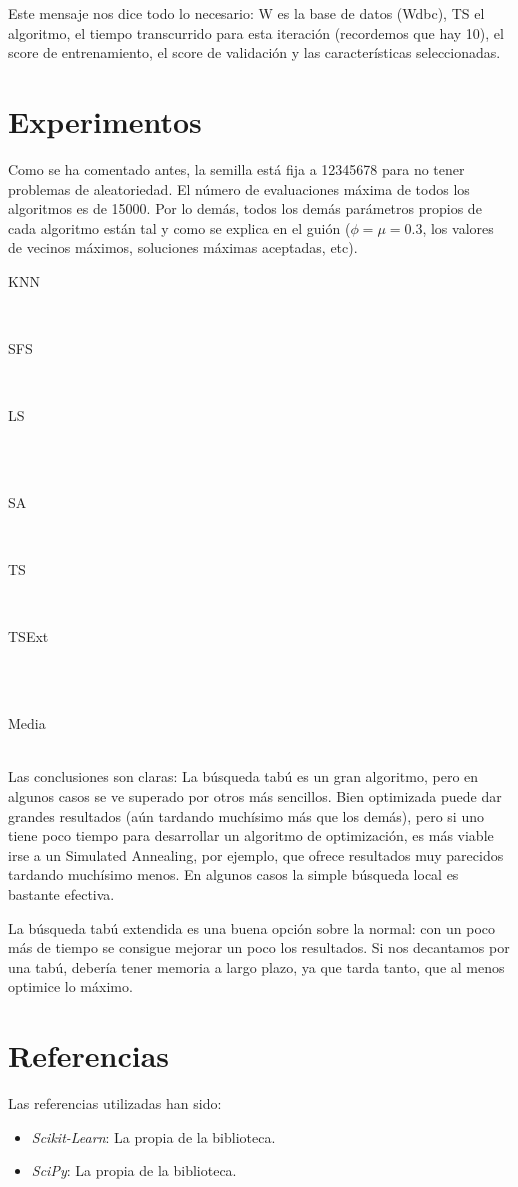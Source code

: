 \documentclass[a4paper, 11pt]{article}
\begin{document}
    Este mensaje nos dice todo lo necesario: W es la base de datos (Wdbc), TS el algoritmo, el tiempo transcurrido para esta iteración (recordemos que hay 10), el score de entrenamiento, el score de validación y las características seleccionadas.
  \section{Experimentos}
    Como se ha comentado antes, la semilla está fija a 12345678 para no tener problemas de aleatoriedad. El número de evaluaciones máxima de todos los algoritmos es de 15000. Por lo demás, todos los demás parámetros propios de cada algoritmo están tal y como se explica en el guión ($\phi=\mu=0.3$, los valores de vecinos máximos, soluciones máximas aceptadas, etc). \\

    \newpage

    \centerline{KNN}
    \\
    \centerline{SFS}
    
    \\ \centerline{LS}
    \\
    \\ \centerline{SA}
    
    \\ \centerline{TS}
     \\
    \newpage
     \centerline{TSExt}
     \\
    \\ \centerline{Media}
    \\

    Las conclusiones son claras: La búsqueda tabú es un gran algoritmo, pero en algunos casos se ve superado por otros más sencillos. Bien optimizada puede dar grandes resultados (aún tardando muchísimo más que los demás), pero si uno tiene poco tiempo para desarrollar un algoritmo de optimización, es más viable irse a un Simulated Annealing, por ejemplo, que ofrece resultados muy parecidos tardando muchísimo menos. En algunos casos la simple búsqueda local es bastante efectiva.

    La búsqueda tabú extendida es una buena opción sobre la normal: con un poco más de tiempo se consigue mejorar un poco los resultados. Si nos decantamos por una tabú, debería tener memoria a largo plazo, ya que tarda tanto, que al menos optimice lo máximo.



  \section{Referencias}

  Las referencias utilizadas han sido:
  \begin{itemize}
    \item \emph{Scikit-Learn}: La propia  de la biblioteca.
    \item \emph{SciPy}: La propia  de la biblioteca.
  \end{itemize}
\end{document}
